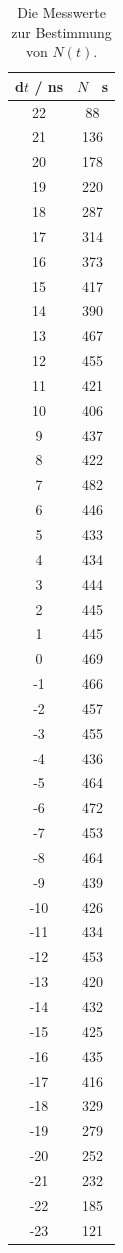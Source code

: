 \documentclass[
  bibliography=totoc,     %
  captions=tableheading,  %
  titlepage=firstiscover, %
]{scrartcl}
\begin{document}
\begin{table}[H]
\centering
\begin{tabular}{c c}
    \toprule
    d$t$ / \si{\nano\second} & $N$ \si{\per10\second} \\
    \midrule
    22  & 88 \\
    21  & 136 \\
    20  & 178 \\
    19  & 220 \\
    18  & 287 \\
    17  & 314 \\
    16  & 373 \\
    15  & 417 \\
    14  & 390 \\
    13  & 467 \\
    12  & 455 \\
    11  & 421 \\
    10  & 406 \\
    9   & 437 \\
    8   & 422 \\
    7   & 482 \\
    6   & 446 \\
    5   & 433 \\
    4   & 434 \\
    3   & 444 \\
    2   & 445 \\
    1   & 445 \\
    0   & 469 \\
    -1  & 466 \\
    -2  & 457 \\
    -3  & 455 \\
    -4  & 436 \\
    -5  & 464 \\
    -6  & 472 \\
    -7  & 453 \\
    -8  & 464 \\
    -9  & 439 \\
    -10 & 426 \\
    -11 & 434 \\
    -12 & 453 \\
    -13 & 420 \\
    -14 & 432 \\
    -15 & 425 \\
    -16 & 435 \\
    -17 & 416 \\
    -18 & 329 \\
    -19 & 279 \\
    -20 & 252 \\
    -21 & 232 \\
    -22 & 185 \\
    -23 & 121 \\
    \bottomrule
  \end{tabular}
    \caption{Die Messwerte zur Bestimmung von $N(t)$.}
    \label{tab:1}
\end{table}
\end{document}
